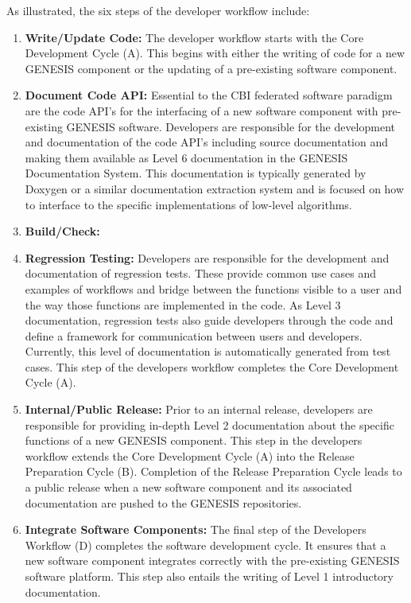 \documentclass[12pt]{article}
\begin{document}
As illustrated, the six steps of the developer workflow include:
\begin{enumerate}
\item{\bf Write/Update Code:} The developer workflow starts with the Core Development Cycle (A). This begins with either the writing of code for a new GENESIS component or the updating of a pre-existing software component.
\item{\bf Document Code API:} Essential to the CBI federated software paradigm are the code API's for the interfacing of a new software component with pre-existing GENESIS software. Developers are responsible for the development and documentation of the code API's including source documentation and making them available as Level 6 documentation in the GENESIS Documentation System. This documentation is typically generated by Doxygen or a similar documentation extraction system and is focused on how to interface to the specific implementations of low-level algorithms. 
\item{\bf Build/Check:}
\item{\bf Regression Testing:} Developers are responsible for the development and documentation of regression tests. These provide common use cases and examples of workflows and bridge between the functions visible to a user and the way those functions are implemented in the code. As Level 3 documentation, regression tests also guide developers through the code and define a framework for communication between users and developers. Currently, this level of documentation is automatically generated from test cases. This step of the developers workflow completes the Core Development Cycle (A).
\item{\bf Internal/Public Release:} Prior to an internal release, developers are responsible for providing in-depth Level 2 documentation about the specific functions of a new GENESIS component. This step in the developers workflow extends the Core Development Cycle (A) into the Release Preparation Cycle (B). Completion of the Release Preparation Cycle leads to a public release when a new software component and its associated documentation are pushed to the GENESIS repositories.
\item{\bf Integrate Software Components:} The final step of the Developers Workflow (D) completes the software development cycle. It ensures that a new software component integrates correctly with the pre-existing GENESIS software platform. This step also entails the writing of Level 1 introductory documentation.
\end{enumerate}
\end{document}
